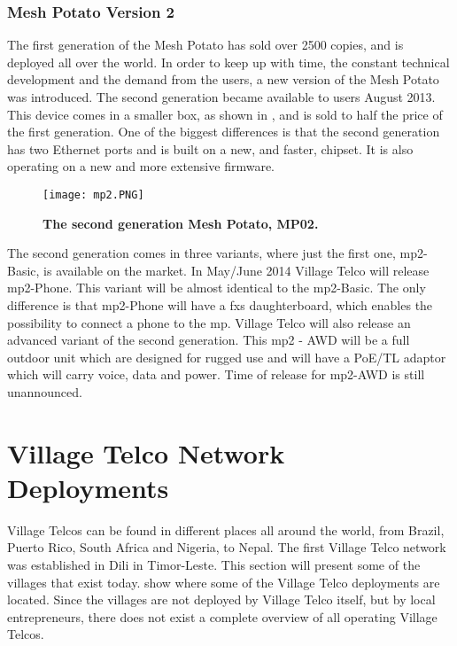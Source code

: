 \subsubsection{Mesh Potato Version 2}
The first generation of the Mesh Potato has sold over 2500 copies, and is deployed all over the world. In order to keep up with time, the constant technical development and the demand from the users, a new version of the Mesh Potato was introduced. The second generation became available to users August 2013. This device comes in a smaller box, as shown in , and is sold to half the price of the first generation. One of the biggest differences is that the second generation has two Ethernet ports and is built on a new, and faster, chipset. It is also operating on a new and more extensive firmware.

\begin{figure}[h!]
  \centering
      \texttt{[image: mp2.PNG]}
  \caption [MP02]{\textbf{The second generation Mesh Potato, MP02.}}
  \label{fig:MP02}
\end{figure}


The second generation comes in three variants, where just the first one, \gls{mp2}-Basic, is available on the market. In May/June 2014 Village Telco will release \gls{mp2}-Phone. This variant will be almost identical to the \gls{mp2}-Basic. The only difference is that \gls{mp2}-Phone will have a \gls{fxs} daughterboard, which enables the possibility to connect a phone to the \gls{mp}. Village Telco will also release an advanced variant of the second generation. This \gls{mp2} - AWD will be a full outdoor unit which are designed for rugged use and will have a PoE/TL adaptor which will carry voice, data and power. Time of release for \gls{mp2}-AWD is still unannounced. 


\section{Village Telco Network Deployments} \label{sec:deployments}
Village Telcos can be found in different places all around the world, from Brazil, Puerto Rico, South Africa and Nigeria, to Nepal. The first Village Telco network was established in Dili in Timor-Leste. This section will present some of the villages that exist today.  show where some of the Village Telco deployments are located. Since the villages are not deployed by Village Telco itself, but by local entrepreneurs, there does not exist a complete overview of all operating Village Telcos. 


